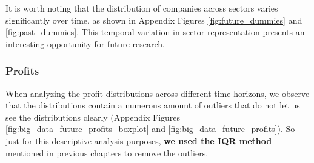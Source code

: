 \documentclass[11pt,english,a4paper,hidelinks]{book}
\begin{document}
\vspace{0.5cm}
\noindent It is worth noting that the distribution of companies across sectors varies significantly over time, as shown in Appendix Figures \ref{fig:future_dummies} and \ref{fig:past_dummies}. This temporal variation in sector representation presents an interesting opportunity for future research.

\subsubsection{Profits}

\noindent When analyzing the profit distributions across different time horizons, we observe that the distributions contain a numerous amount of outliers that do not let us see the distributions clearly (Appendix Figures \ref{fig:big_data_future_profits_boxplot} and \ref{fig:big_data_future_profits}). So just for this descriptive analysis purposes, \textbf{we used the IQR method} mentioned in previous chapters to remove the outliers.
\end{document}
